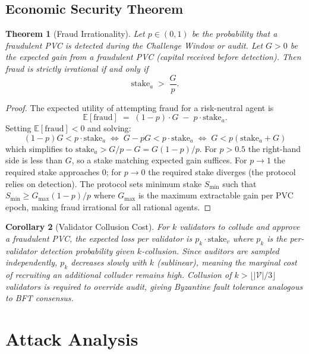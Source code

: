 \documentclass[11pt,a4paper]{article}
\theoremstyle{plain}
\newtheorem{theorem}{Theorem}[section]
\newtheorem{corollary}[theorem]{Corollary}
\theoremstyle{definition}
\theoremstyle{remark}
\newcommand{\E}{\mathbb{E}}
\begin{document}
\subsection{Economic Security Theorem}

\begin{theorem}[Fraud Irrationality]
\label{thm:fraud}
Let $p \in (0,1)$ be the probability that a fraudulent PVC is detected during
the Challenge Window or audit. Let $G > 0$ be the expected gain from a
fraudulent PVC (capital received before detection). Then fraud is strictly
irrational if and only if
\[
  \mathrm{stake}_a \;>\; \frac{G}{p}.
\]
\end{theorem}

\begin{proof}
The expected utility of attempting fraud for a risk-neutral agent is
\[
  \E[\text{fraud}]
  \;=\;
  (1-p) \cdot G \;-\; p \cdot \mathrm{stake}_a.
\]
Setting $\E[\text{fraud}] < 0$ and solving:
\[
  (1-p) G < p \cdot \mathrm{stake}_a
  \;\iff\;
  G - pG < p \cdot \mathrm{stake}_a
  \;\iff\;
  G < p(\mathrm{stake}_a + G)
\]
which simplifies to $\mathrm{stake}_a > G/p - G = G(1-p)/p$.
For $p > 0.5$ the right-hand side is less than $G$, so a stake matching
expected gain suffices. For $p \to 1$ the required stake approaches 0;
for $p \to 0$ the required stake diverges (the protocol relies on detection).
The protocol sets minimum stake $S_{\min}$ such that
$S_{\min} \ge G_{\max}(1-p)/p$ where $G_{\max}$ is the maximum extractable
gain per PVC epoch, making fraud irrational for all rational agents.
\end{proof}

\begin{corollary}[Validator Collusion Cost]
For $k$ validators to collude and approve a fraudulent PVC, the expected loss
per validator is $p_k \cdot \mathrm{stake}_v$ where $p_k$ is the per-validator
detection probability given $k$-collusion. Since auditors are sampled
independently, $p_k$ decreases slowly with $k$ (sublinear), meaning the
marginal cost of recruiting an additional colluder remains high. Collusion of
$k > \lfloor |\mathcal{V}| / 3 \rfloor$ validators is required to override
audit, giving Byzantine fault tolerance analogous to BFT consensus.
\end{corollary}

\section{Attack Analysis}
\end{document}
